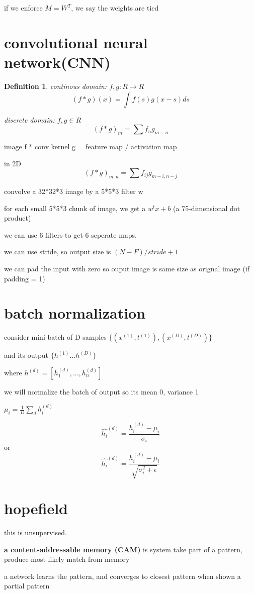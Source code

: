 \documentclass[10pt]{article}
\theoremstyle{break}
\newtheorem{defn}{Definition}[subsection]
\begin{document}
if we enforce $M=W^T$, we say the weights are tied

\section{convolutional neural network(CNN)}
\begin{defn}
    continous domain: $f,g: R\rightarrow R$
    $$(f*g)(x)=\int f(s) g(x-s) ds$$ 

    discrete domain: $f, g \in R$
    $$(f*g)_m = \sum f_n g_{m-n}$$
\end{defn}

image f * conv kernel g = feature map / activation map

in 2D $$(f*g)_{m,n}=\sum f_{ij}g_{m-i, n-j}$$

convolve a 32*32*3 image by a 5*5*3 filter w 

for each small 5*5*3 chunk of image, we get a $w^tx+b$ (a 75-dimensional dot product)

we can use 6 filters to get 6 seperate maps.

we can use stride, so output size is $(N-F)/stride + 1$

we can pad the input with zero so ouput image is same size as orignal image (if padding = 1)
\section{batch normalization}
consider mini-batch of D samples 
$\{(x^{(1)}, t^{(1)}),(x^{(D)}, t^{(D)})\}$

and its output $\{h^{(1)}... h^{(D)}\}$

where $h^{(d)} = [h_1^{(d)},...,h_n^{(d)}]$

we will normalize the batch of output so its mean 0, variance 1

$\mu_i = \frac{1}{D}\sum_d h_i^{(d)}$

$$\hat{h_i}^{(d)} = \frac{ h_i ^{(d)} - \mu _ i}{\sigma_i}$$
or
$$\hat{h_i}^{(d)} = \frac{ h_i ^{(d)} - \mu _ i}{\sqrt{\sigma_i^2+\epsilon}}$$

\section{hopefield }
this is unsupervised.

\textbf{a content-addressable memory (CAM)} is system take part of a pattern, 
produce most likely match from memory

a network learns the pattern, and converges to closest pattern when shown a partial pattern
\end{document}
